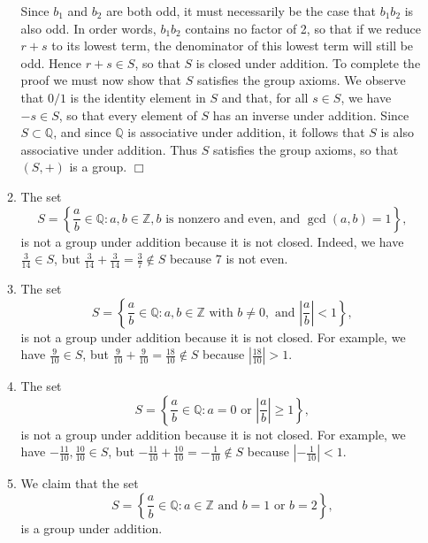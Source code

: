 \documentclass[9pt]{article}
\newcommand{\qed}{\hfill \ensuremath{\Box}}
\newcommand{\Z}{\mathbb{Z}}
\newcommand{\Q}{\mathbb{Q}}
\begin{document}
\begin{enumerate}
\begin{enumerate}
               Since $b_1$ and $b_2$ are both odd, it must necessarily be the 
               case that $b_1b_2$ is also odd. In order words, $b_1b_2$ contains 
               no factor of 2, so that if we reduce $r + s$ to its lowest term, 
               the denominator of this lowest term will still be odd. Hence
               $r + s \in S$, so that $S$ is closed under addition. To complete 
               the proof we must now show that $S$ satisfies the group axioms. 
               We observe that $0/1$ is the identity element in $S$ and that, 
               for all $s \in S$, we have $-s \in S$, so that every 
               element of $S$ has an inverse under addition. Since
               $S \subset \Q$, and since $\Q$ is associative under addition, 
               it follows that $S$ is also associative under addition. Thus $S$ 
               satisfies the group axioms, so that $(S, +)$ is a group. \qed
         \item The set
               $$S = \left\{\frac{a}{b} \in \Q : a, b \in \Z, b
                        \text{ is nonzero and even,} \text{ and }
                        \gcd(a, b) = 1\right\},$$
               is not a group under addition because it is not closed. Indeed,
               we have $\frac{3}{14} \in S$, but
               $\frac{3}{14} + \frac{3}{14} = \frac{3}{7} \notin S$ because 7 is
               not even.
         \item The set
               $$S = \left\{\frac{a}{b} \in \Q : a, b \in \Z \text{ with }
                  b \neq 0, \text{ and }
                  \left|\frac{a}{b}\right| < 1\right\},$$
               is not a group under addition because it is not closed. For 
               example, we have $\frac{9}{10} \in S$, but
               $\frac{9}{10} + \frac{9}{10} = \frac{18}{10} \notin S$
               because $\left|\frac{18}{10}\right| > 1$.
         \item The set
               $$S = \left\{\frac{a}{b} \in \Q : a = 0 \text{ or }
                     \left|\frac{a}{b}\right| \ge 1\right\},$$
               is not a group under addition because it is not closed. For
               example, we have $-\frac{11}{10}, \frac{10}{10} \in S$, but
               $-\frac{11}{10} + \frac{10}{10} = -\frac{1}{10} \notin S$ because
               $\left|-\frac{1}{10}\right| < 1$.
         \item We claim that the set
               $$S = \left\{\frac{a}{b} \in \Q : a \in \Z \text{ and }
                   b = 1 \text{ or } b = 2\right\},$$
               is a group under addition.


\end{enumerate}
\end{enumerate}
\end{document}
